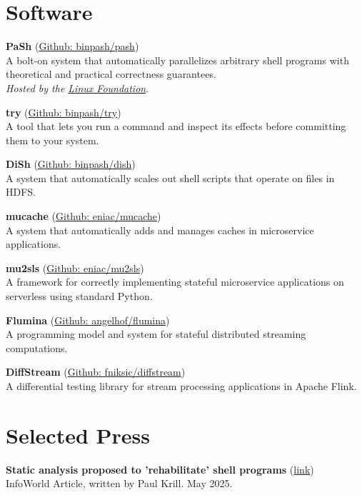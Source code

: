 \documentclass[margin]{res}
\begin{document}
\begin{resume}
\section{Software}
\hypertarget{sec:software}{}

\textbf{PaSh} (\href{https://github.com/binpash/pash}{Github: binpash/pash}) \\
A bolt-on system that automatically parallelizes arbitrary shell programs with theoretical and practical correctness guarantees. \\
{\em Hosted by the \href{https://www.linuxfoundation.org/press-release/linux-foundation-to-host-the-pash-project-accelerating-shell-scripting-with-automated-parallelization-for-industrial-use-cases/}{Linux Foundation}}.

\textbf{try} (\href{https://github.com/binpash/try}{Github: binpash/try}) \\
A tool that lets you run a command and inspect its effects before committing them to your system.

\textbf{DiSh} (\href{https://github.com/binpash/dish}{Github: binpash/dish}) \\
A system that automatically scales out shell scripts that operate on files in HDFS.

\textbf{mucache} (\href{https://github.com/eniac/mucache}{Github: eniac/mucache}) \\
A system that automatically adds and manages caches in microservice applications.

\textbf{mu2sls} (\href{https://github.com/eniac/mu2sls}{Github: eniac/mu2sls})  \\
A framework for correctly implementing stateful microservice applications on serverless using standard Python. 

\textbf{Flumina} (\href{https://github.com/angelhof/flumina}{Github: angelhof/flumina}) \\
A programming model and system for stateful distributed streaming computations.

\textbf{DiffStream} (\href{https://github.com/fniksic/diffstream}{Github: fniksic/diffstream}) \\
A differential testing library for stream processing applications in Apache Flink.

\section{Selected Press}
\hypertarget{sec:press}{}

\textbf{Static analysis proposed to 'rehabilitate' shell programs} (\href{https://www.infoworld.com/article/3977802/static-analysis-proposed-to-rehabilitate-shell-programs.html}{link}) \\
InfoWorld Article, written by Paul Krill. May 2025.


\end{resume}
\end{document}
